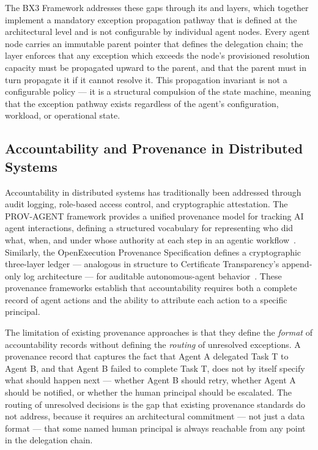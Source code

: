 The BX3 Framework addresses these gaps through its \purpose{} and \bounds{} layers, which together implement a mandatory exception propagation pathway that is defined at the architectural level and is not configurable by individual agent nodes. Every agent node carries an immutable parent pointer that defines the delegation chain; the \bounds{} layer enforces that any exception which exceeds the node's provisioned resolution capacity must be propagated upward to the parent, and that the parent must in turn propagate it if it cannot resolve it. This propagation invariant is not a configurable policy — it is a structural compulsion of the state machine, meaning that the exception pathway exists regardless of the agent's configuration, workload, or operational state.

\subsection{Accountability and Provenance in Distributed Systems}
\label{sec:accountability}

Accountability in distributed systems has traditionally been addressed through audit logging, role-based access control, and cryptographic attestation. The PROV-AGENT framework provides a unified provenance model for tracking AI agent interactions, defining a structured vocabulary for representing who did what, when, and under whose authority at each step in an agentic workflow~\cite{provcagent2025,provagent2025}. Similarly, the OpenExecution Provenance Specification defines a cryptographic three-layer ledger — analogous in structure to Certificate Transparency's append-only log architecture — for auditable autonomous-agent behavior~\cite{openexecution2025}. These provenance frameworks establish that accountability requires both a complete record of agent actions and the ability to attribute each action to a specific principal.

The limitation of existing provenance approaches is that they define the \emph{format} of accountability records without defining the \emph{routing} of unresolved exceptions. A provenance record that captures the fact that Agent A delegated Task T to Agent B, and that Agent B failed to complete Task T, does not by itself specify what should happen next — whether Agent B should retry, whether Agent A should be notified, or whether the human principal should be escalated. The routing of unresolved decisions is the gap that existing provenance standards do not address, because it requires an architectural commitment — not just a data format — that some named human principal is always reachable from any point in the delegation chain.


